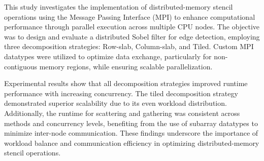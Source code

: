 

This study investigates the implementation of distributed-memory stencil operations using the Message Passing Interface (MPI)\cite{mpi_spec} to enhance computational performance through parallel execution across multiple CPU nodes. The objective was to design and evaluate a distributed Sobel filter for edge detection, employing three decomposition strategies: Row-slab, Column-slab, and Tiled. Custom MPI datatypes were utilized to optimize data exchange, particularly for non-contiguous memory regions, while ensuring scalable parallelization.

Experimental results show that all decomposition strategies improved runtime performance with increasing concurrency. The tiled decomposition strategy demonstrated superior scalability due to its even workload distribution. Additionally, the runtime for scattering and gathering was consistent across methods and concurrency levels, benefiting from the use of subarray datatypes to minimize inter-node communication. These findings underscore the importance of workload balance and communication efficiency in optimizing distributed-memory stencil operations.
